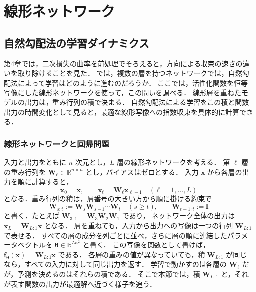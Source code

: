 \documentclass[../main.tex]{subfiles}
\begin{document}
\ifSubfilesClassLoaded{\setcounter{chapter}{4}}{}

\chapter{線形ネットワーク}

\section{自然勾配法の学習ダイナミクス}
\label{sec:linear-natural-gradient}

第4章では，二次損失の曲率を前処理でそろえると，方向による収束の速さの違いを取り除けることを見た．
では，複数の層を持つネットワークでは，自然勾配法によって学習はどのように進むのだろうか．
ここでは，活性化関数を恒等写像にした線形ネットワークを使って，この問いを調べる．
線形層を重ねたモデルの出力は，重み行列の積で決まる．
自然勾配法による学習をこの積と関数出力の時間変化として見ると，最適な線形写像への指数収束を具体的に計算できる\cite{bernacchia2018exact}．

\subsection{線形ネットワークと回帰問題}

入力と出力をともに $n$ 次元とし，$L$ 層の線形ネットワークを考える．
第 $\ell$ 層の重み行列を $\bm{W}_\ell\in\mathbb{R}^{n\times n}$ とし，バイアスはゼロとする．
入力 $\bm{x}$ から各層の出力を順に計算すると，
\begin{equation}
  \bm{x}_0=\bm{x},\qquad
  \bm{x}_\ell=\bm{W}_\ell\bm{x}_{\ell-1}
  \quad(\ell=1,\ldots,L)
  \label{eq:linear-network}
\end{equation}
となる．重み行列の積は，層番号の大きい方から順に掛ける約束で
\begin{equation}
  \bm{W}_{s:t}:=\bm{W}_s\bm{W}_{s-1}\cdots\bm{W}_t
  \quad(s\geq t),\qquad
  \bm{W}_{t-1:t}:=\bm{I}
  \label{eq:linear-weight-products}
\end{equation}
と書く．たとえば $\bm{W}_{3:1}=\bm{W}_3\bm{W}_2\bm{W}_1$ であり，
ネットワーク全体の出力は $\bm{x}_L=\bm{W}_{L:1}\bm{x}$ となる．
層を重ねても，入力から出力への写像は一つの行列 $\bm{W}_{L:1}$ で表せる．
すべての層の成分を列ごとに並べ，さらに層の順に連結したパラメータベクトルを $\bm{\theta}\in\mathbb{R}^{Ln^2}$ と書く．
この写像を関数として書けば，$\bm{f}_{\bm{\theta}}(\bm{x})=\bm{W}_{L:1}\bm{x}$ である．
各層の重みの値が異なっていても，積 $\bm{W}_{L:1}$ が同じなら，すべての入力に対して同じ出力を返す．
学習で動かすのは各層の $\bm{W}_\ell$ だが，予測を決めるのはそれらの積である．
そこで本節では，積 $\bm{W}_{L:1}$ と，それが表す関数の出力が最適解へ近づく様子を追う．
\end{document}
